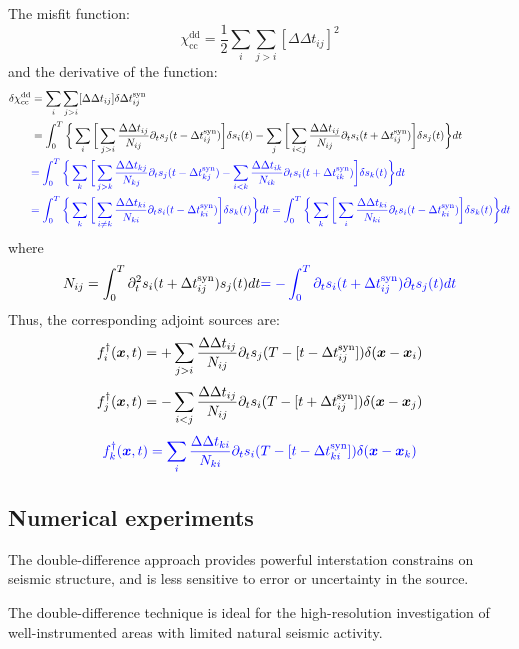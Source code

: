 The misfit function:
\[ \chi_\text{cc}^\text{dd} = \frac{1}{2} \sum_i \sum_{j>i}
  [ \Delta\Delta t_{ij} ]^2 \]
and the derivative of the function:
\begin{align*}
  \delta\chi_\text{cc}^\text{dd} & = \sum_i \sum_{j>i} [ \Delta\Delta t_{ij} ]
    \delta\Delta t_{ij}^\text{syn} \\
  & = \int_0^T \bigg\{ \sum_i \bigg[ \sum_{j>i} \frac{\Delta\Delta t_{ij}}
    {N_{ij}} \partial_t s_j(t - \Delta t_{ij}^\text{syn}) \bigg] \delta s_i(t)
    - \sum_j \bigg[ \sum_{i<j} \frac{\Delta\Delta t_{ij}}{N_{ij}} \partial_t s_i
    (t + \Delta t_{ij}^\text{syn}) \bigg] \delta s_j(t) \bigg\} dt \\
  & {\color{blue} = \int_0^T \bigg\{ \sum_k \bigg[ \sum_{j>k} \frac{\Delta\Delta t_{kj}}
    {N_{kj}} \partial_t s_j(t - \Delta t_{kj}^\text{syn}) - \sum_{i<k}
    \frac{\Delta\Delta t_{ik}}{N_{ik}} \partial_t s_i(t
    + \Delta t_{ik}^\text{syn}) \bigg] \delta s_k(t) \bigg\} dt } \\
  & {\color{blue} = \int_0^T \bigg\{ \sum_k \bigg[ \sum_{i \neq k}
    \frac{\Delta\Delta t_{ki}}{N_{ki}} \partial_t s_i(t
    - \Delta t_{ki}^\text{syn}) \bigg] \delta s_k(t) \bigg\} dt
    = \int_0^T \bigg\{ \sum_k \bigg[ \sum_i \frac{\Delta\Delta t_{ki}}{N_{ki}}
    \partial_t s_i(t - \Delta t_{ki}^\text{syn}) \bigg] \delta s_k(t)
    \bigg\} dt }
\end{align*}
where
\[ N_{ij} = \int_0^T \partial_t^2 s_i(t + \Delta t_{ij}^\text{syn}) s_j(t) dt
  {\color{blue} = - \int_0^T \partial_t s_i(t + \Delta t_{ij}^\text{syn})
  \partial_t s_j(t) dt } \]
Thus, the corresponding adjoint sources are:
\[ f_i^\dagger(\boldsymbol{x}, t) = + \sum_{j>i} \frac{\Delta\Delta t_{ij}}{N_{ij}}
  \partial_t s_j(T - [t - \Delta t_{ij}^\text{syn}])
  \delta(\boldsymbol{x} - \boldsymbol{x}_i) \]
\[ f_j^\dagger(\boldsymbol{x}, t) = - \sum_{i<j} \frac{\Delta\Delta t_{ij}}{N_{ij}}
  \partial_t s_i(T - [t + \Delta t_{ij}^\text{syn}])
  \delta(\boldsymbol{x} - \boldsymbol{x}_j) \]
\[ {\color{blue} f_k^\dagger(\boldsymbol{x}, t) = \sum_i \frac{\Delta\Delta t_{ki}}{N_{ki}}
  \partial_t s_i(T - [t - \Delta t_{ki}^\text{syn}])
  \delta(\boldsymbol{x} - \boldsymbol{x}_k) } \]

\subsection{Numerical experiments}
The double-difference approach provides powerful interstation constrains
on seismic structure, and is less sensitive to error or uncertainty
in the source.

The double-difference technique is ideal for the high-resolution investigation
of well-instrumented areas with limited natural seismic activity.

